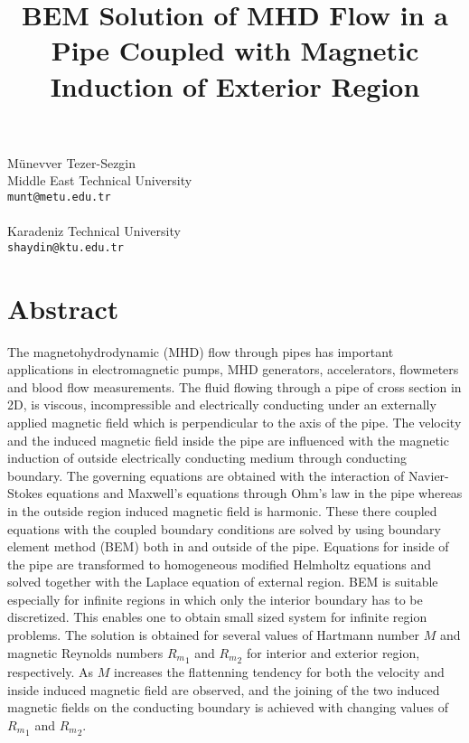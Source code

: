 \title{BEM Solution of MHD Flow in a Pipe Coupled with Magnetic Induction of Exterior Region}
 \author{} \institute{}
\maketitle
\begin{center}
{\large M{\"u}nevver  Tezer-Sezgin}\\
Middle East Technical University\\
{\tt munt@metu.edu.tr}
\\ \\
Karadeniz Technical University\\
{\tt shaydin@ktu.edu.tr}

\end{center}

\section*{Abstract}

The magnetohydrodynamic (MHD) flow through pipes has important applications in electromagnetic pumps, MHD generators, accelerators, flowmeters and blood flow measurements. The fluid flowing through a pipe of cross section in 2D, is viscous, incompressible and electrically conducting under an externally applied magnetic field which is perpendicular to the axis of the pipe. The velocity and the induced magnetic field inside the pipe are influenced with the magnetic induction of outside electrically conducting medium through conducting boundary. The governing equations are obtained with the interaction of Navier-Stokes equations and Maxwell's equations through Ohm's law in the pipe whereas in the outside region induced magnetic field is harmonic. These there coupled equations with the coupled boundary conditions are solved by using boundary element method (BEM) both in and outside of the pipe. Equations for inside of the pipe are transformed to homogeneous modified Helmholtz equations and solved together with the Laplace equation of external region. BEM is suitable especially for infinite regions in which only the interior boundary has to be discretized. This enables one to obtain small sized system for infinite region problems. The solution is obtained for several values of Hartmann number $M$ and magnetic Reynolds numbers ${R_m}_1$ and ${R_m}_2$ for interior and exterior region, respectively. As $M$ increases the flattenning tendency for both the velocity and inside induced magnetic field are observed, and the joining of the two induced magnetic fields on the conducting boundary is achieved with changing values of ${R_m}_1$ and ${R_m}_2$.

